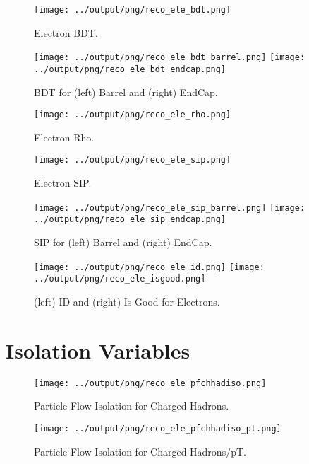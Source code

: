 \documentclass[11pt]{book}
\begin{document}
\begin{figure}[htb]
\centering
\texttt{[image: ../output/png/reco\_ele\_bdt.png]}
\caption{Electron BDT.}
\label{fig:reco_ele_bdt}
\end{figure}

\begin{figure}[htb]
\centering
\texttt{[image: ../output/png/reco\_ele\_bdt\_barrel.png]}
\texttt{[image: ../output/png/reco\_ele\_bdt\_endcap.png]}
\caption{BDT for (left) Barrel and (right) EndCap.}
\label{fig:reco_ele_bdt_regions}
\end{figure}

\begin{figure}[htb]
\centering
\texttt{[image: ../output/png/reco\_ele\_rho.png]}
\caption{Electron Rho.}
\label{fig:reco_ele_rho}
\end{figure}

\begin{figure}[htb]
\centering
\texttt{[image: ../output/png/reco\_ele\_sip.png]}
\caption{Electron SIP.}
\label{fig:reco_ele_sip}
\end{figure}

\begin{figure}[htb]
\centering
\texttt{[image: ../output/png/reco\_ele\_sip\_barrel.png]}
\texttt{[image: ../output/png/reco\_ele\_sip\_endcap.png]}
\caption{SIP for (left) Barrel and (right) EndCap.}
\label{fig:reco_ele_sip_regions}
\end{figure}

\begin{figure}[htb]
\centering
\texttt{[image: ../output/png/reco\_ele\_id.png]}
\texttt{[image: ../output/png/reco\_ele\_isgood.png]}
\caption{(left) ID and (right) Is Good for Electrons.}
\label{fig:reco_ele_id_isgood}
\end{figure}
\clearpage

\section{Isolation Variables}
\begin{figure}[htb]
\centering
\texttt{[image: ../output/png/reco\_ele\_pfchhadiso.png]}
\caption{Particle Flow Isolation for Charged Hadrons.}
\label{fig:reco_ele_pfchhadiso}
\end{figure}

\begin{figure}[htb]
\centering
\texttt{[image: ../output/png/reco\_ele\_pfchhadiso\_pt.png]}
\caption{Particle Flow Isolation for Charged Hadrons/pT.}
\label{fig:reco_ele_pfchhadiso_pt}
\end{figure}
\end{document}
